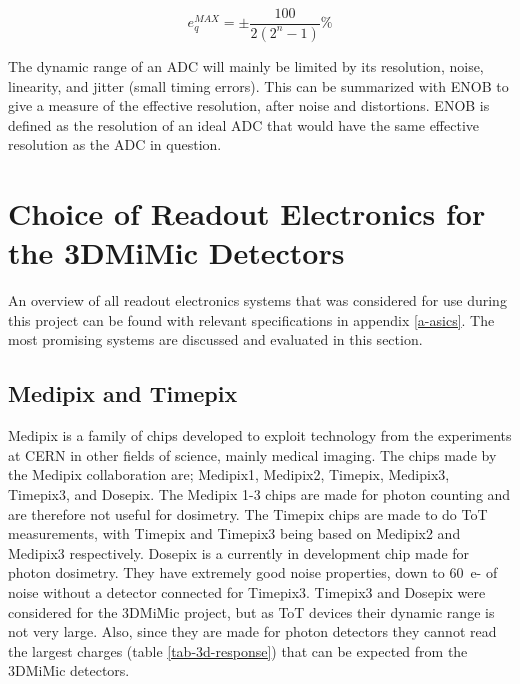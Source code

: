 \documentclass[../main/thesis.tex]{subfiles}
\begin{document}
\begin{equation}%
e_q^{MAX} = \pm \frac{100}{2(2^n - 1)}\%
\label{eq-eqmax}
\end{equation}

The dynamic range of an \gls{ADC} will mainly be limited by its resolution, noise, linearity, and jitter (small timing errors). This can be summarized with \gls{ENOB} to give a measure of the effective resolution, after noise and distortions. \gls{ENOB} is defined as the resolution of an ideal \gls{ADC} that would have the same effective resolution as the \gls{ADC} in question.



\section{Choice of Readout Electronics for the 3DMiMic Detectors}

An overview of all readout electronics systems that was considered for use during this project can be found with relevant specifications in appendix \ref{a-asics}. The most promising systems are discussed and evaluated in this section. 

\subsection{Medipix and Timepix}
\label{e-medipix}
Medipix is a family of chips developed to exploit technology from the experiments at CERN in other fields of science, mainly medical imaging. The chips made by the Medipix collaboration are; Medipix1, Medipix2, Timepix, Medipix3, Timepix3, and Dosepix. The Medipix 1-3 chips are made for photon counting and are therefore not useful for dosimetry. The Timepix chips are made to do \gls{ToT} measurements, with Timepix and Timepix3 being based on Medipix2 and Medipix3 respectively. Dosepix is a currently in development chip made for photon dosimetry. They have extremely good noise properties, down to 60~e- of noise without a detector connected for Timepix3. Timepix3 and Dosepix were considered for the 3DMiMic project, but as \gls{ToT} devices their dynamic range is not very large. Also, since they are made for photon detectors they cannot read the largest charges (table \ref{tab-3d-response}) that can be expected from the 3DMiMic detectors. \citetext{\citeauthor{Medipix}}
\end{document}
